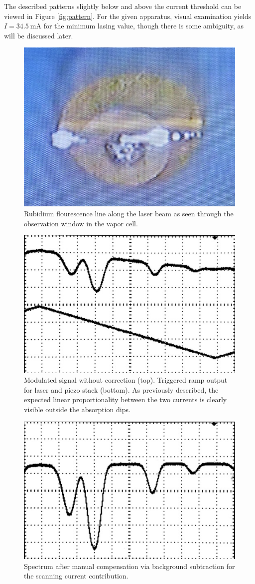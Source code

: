The described patterns slightly below and above the current threshold can be viewed in Figure \ref{fig:pattern}. For the given
apparatus, visual examination yields $I = \qty{34.5}{\milli\ampere}$ for the minimum lasing value, though there is some ambiguity,
as will be discussed later.

\begin{figure}
    \centering
    \includegraphics[width=0.48\linewidth]{content/measurement/fluorescence.jpg}
    \captionsetup{width=0.58\linewidth}
    \caption{Rubidium flourescence line along the laser beam as seen through the observation window in the vapor cell.}
    \label{fig:fluorescence}
\end{figure}

\begin{figure}
    \centering
    \includegraphics[width=0.72\linewidth]{content/measurement/ramp.jpg}
    \captionsetup{width=0.8\linewidth}
    \caption{Modulated signal without correction (top). Triggered ramp output for laser and piezo stack (bottom).
             As previously described, the expected linear proportionality between the two currents is clearly visible
             outside the absorption dips.}
    \label{fig:ramp}
\end{figure}

\begin{figure}
    \centering
    \includegraphics[width=0.72\linewidth]{content/measurement/spectrum.jpg}
    \captionsetup{width=0.8\linewidth}
    \caption{Spectrum after manual compensation via background subtraction for the scanning current contribution.}
    \label{fig:spectrum}
\end{figure}
